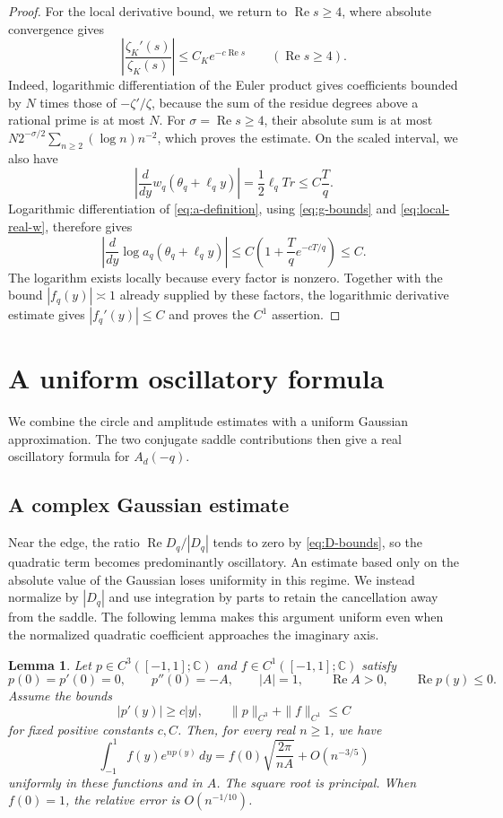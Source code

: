 \documentclass[11pt,reqno]{amsart}
\numberwithin{equation}{section}
\newtheorem{lemma}[theorem]{Lemma}
\renewcommand{\Re}{\operatorname{Re}}
\newcommand{\C}{\mathbb C}
\newcommand{\dd}{\,d}
\begin{document}
\begin{proof}
For the local derivative bound, we return to $\Re s\ge4$, where
absolute convergence gives
\[
 \left|\frac{\zeta_K'(s)}{\zeta_K(s)}\right|
 \le C_Ke^{-c\Re s}\qquad(\Re s\ge4).
\]
Indeed, logarithmic differentiation of the Euler product gives
coefficients bounded by $N$ times those of $-\zeta'/\zeta$,
because the sum of the residue degrees above a rational prime
is at most $N$.
For $\sigma=\Re s\ge4$, their absolute sum is at most
$N2^{-\sigma/2}\sum_{n\ge2}(\log n)n^{-2}$, which proves
the estimate. On the scaled interval, we also have
\[
 \left|\frac{d}{dy}w_q(\theta_q+\ell_qy)\right|
 =\frac12\ell_qTr\le C\frac Tq.
\]
Logarithmic differentiation of \eqref{eq:a-definition}, using
\eqref{eq:g-bounds} and \eqref{eq:local-real-w}, therefore gives
\[
 \left|\frac{d}{dy}\log a_q(\theta_q+\ell_qy)\right|
 \le C\left(1+\frac Tq e^{-cT/q}\right)\le C.
\]
The logarithm exists locally because every factor is nonzero.
Together with the bound $|f_q(y)|\asymp1$ already supplied by these
factors, the logarithmic derivative estimate gives
$|f_q'(y)|\le C$ and proves the $C^1$ assertion.
\end{proof}

\section{A uniform oscillatory formula}\label{sec:oscillation}

We combine the circle and amplitude estimates with a uniform
Gaussian approximation. The two conjugate saddle contributions
then give a real oscillatory formula for $A_d(-q)$.

\subsection{A complex Gaussian estimate}

Near the edge, the ratio $\Re D_q/|D_q|$ tends to zero by
\eqref{eq:D-bounds}, so the quadratic term becomes predominantly
oscillatory. An estimate based only on the absolute value of the
Gaussian loses uniformity in this regime. We instead normalize
by $|D_q|$ and use integration by parts to retain the cancellation
away from the saddle. The following lemma makes this argument
uniform even when the normalized quadratic coefficient approaches
the imaginary axis.

\begin{lemma}\label{lem:Gaussian}
Let $p\in C^3([-1,1];\C)$ and $f\in C^1([-1,1];\C)$ satisfy
\[
 p(0)=p'(0)=0,\qquad p''(0)=-A,\qquad
 |A|=1,\qquad \Re A>0,\qquad \Re p(y)\le0.
\]
Assume the bounds
\[
 |p'(y)|\ge c|y|,\qquad
 \|p\|_{C^3}+\|f\|_{C^1}\le C
\]
for fixed positive constants $c,C$. Then, for every real $n\ge1$, we have
\begin{equation}\label{eq:Gaussian-estimate}
 \int_{-1}^1f(y)e^{np(y)}\dd y
 =f(0)\sqrt{\frac{2\pi}{nA}}+O(n^{-3/5})
\end{equation}
uniformly in these functions and in $A$.
The square root is principal. When $f(0)=1$, the relative error is
$O(n^{-1/10})$.
\end{lemma}
\end{document}
